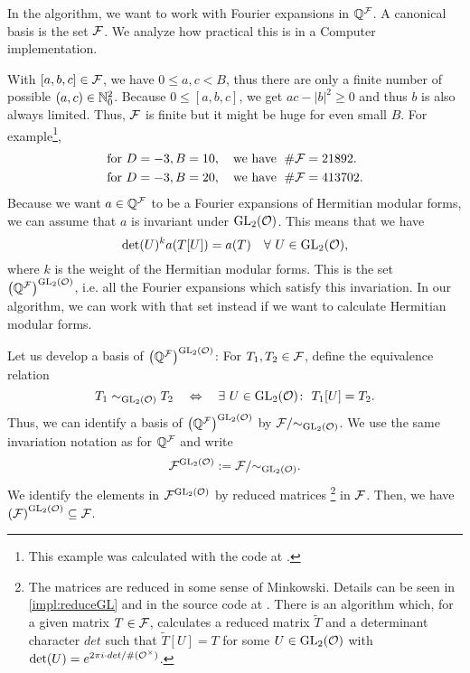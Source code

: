 \begin{remark}
\label{remark:reducedCurlF}
\label{reducedCurlF}
In the algorithm, we want to work with Fourier expansions in $\mathbb{Q}^{\mathcal{F}}$. A canonical basis is the set $\mathcal{F}$. We analyze how practical this is in a Computer implementation.

With $[a,b,c] \in \mathcal{F}$, we have $0\le a,c<B$, thus there are only a finite number of possible $(a,c) \in \mathbb{N}_0^2$. Because $0 \le [a,b,c]$, we get $ac - \left| b \right|^2 \ge 0$ and thus $b$ is also always limited. Thus, $\mathcal{F}$ is finite but it might be huge for even small $B$.
For example\footnote{ This example was calculated with the code at \cite{Zeyer13Github}.},
\begin{align*}
& \text{for } D=-3, B=10,\quad \text{we have } \; \# \mathcal{F} = 21892. \\
& \text{for } D=-3, B=20,\quad \text{we have } \; \# \mathcal{F} = 413702.
\end{align*}
%
Because we want $a \in \mathbb{Q}^{\mathcal{F}}$ to be a Fourier expansions of Hermitian modular forms, we can assume that $a$ is invariant under $\operatorname{GL}_2(\mathcal{O})$. This means that we have
\[ \det(U)^k a(T[U]) = a(T) \quad \forall\ U \in \operatorname{GL}_2(\mathcal{O}) , \]
where $k$ is the weight of the Hermitian modular forms.
This is the set ${\left(\mathbb{Q}^{\mathcal{F}}\right)}^{\operatorname{GL}_2(\mathcal{O})}$, i.e. all the Fourier expansions which satisfy this invariation. In our algorithm, we can work with that set instead if we want to calculate Hermitian modular forms.

Let us develop a basis of ${\left(\mathbb{Q}^{\mathcal{F}}\right)}^{\operatorname{GL}_2(\mathcal{O})}$: For $T_1, T_2 \in \mathcal{F}$, define the equivalence relation
\[ T_1 \sim_{\operatorname{GL}_2(\mathcal{O})} T_2 \quad \Leftrightarrow \quad \exists\ U \in \operatorname{GL}_2(\mathcal{O}) \colon\ T_1[U] = T_2. \]
Thus, we can identify a basis of ${\left(\mathbb{Q}^{\mathcal{F}}\right)}^{\operatorname{GL}_2(\mathcal{O})}$ by $\mathcal{F} / { \sim_{\operatorname{GL}_2(\mathcal{O})} }$.
We use the same invariation notation as for $\mathbb{Q}^{\mathcal{F}}$ and write
\[ {\mathcal{F}}^{\operatorname{GL}_2(\mathcal{O})} := \mathcal{F} / { \sim_{\operatorname{GL}_2(\mathcal{O})} } . \]
We identify the elements in ${\mathcal{F}}^{\operatorname{GL}_2(\mathcal{O})}$ by reduced matrices%
\footnote{
The matrices are reduced in some sense of Minkowski. Details can be seen in \cref{impl:reduceGL} and in the source code at \cite{Zeyer13Github}. There is an algorithm which, for a given matrix $T \in \mathcal{F}$, calculates a reduced matrix $\tilde{T}$ and a determinant character $det$ such that $\tilde{T}[U] = T$ for some $U \in \operatorname{GL}_2(\mathcal{O})$ with $\det(U) = e^{2 \pi i \cdot det / {\#(\mathcal{O}^\times)}}$.
}
in $\mathcal{F}$. Then, we have ${\left(\mathcal{F}\right)}^{\operatorname{GL}_2(\mathcal{O})} \subseteq \mathcal{F}$.


\end{remark}
